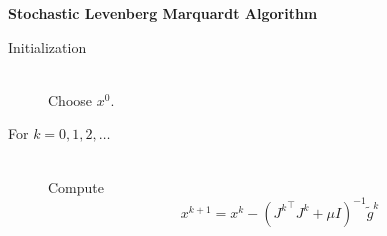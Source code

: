 \documentclass{article}
\begin{document}
\begin{algorithm}
\caption{\bf  Stochastic Levenberg Marquardt Algorithm}
\vspace{-4ex}
\label{alg:SLM}
\begin{rm}
\begin{description}
\item[]
\vspace{3ex}
\item[Initialization] \ \\
Choose $x^0$.
\vspace{1ex}
\item[For $k=0,1,2,\ldots$] \ \\
\vspace{-2ex}
Compute 
\begin{equation}\label{eq:iter_update}
x^{k+1} = x^k - ({J^k}^\top J^k + \mu I)^{-1} \tilde{g}^k
\end{equation}
\end{description}
\end{rm}
\end{algorithm}
\end{document}
